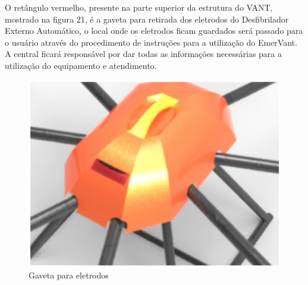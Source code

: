 O retângulo vermelho, presente na parte superior da estrutura do VANT, mostrado na figura 21, é a gaveta para retirada dos eletrodos do Desfibrilador Externo Automático, o local onde os eletrodos ficam guardados será passado para o usuário através do procedimento de instruções para a utilização do EmerVant. A central ficará responsável por dar todas as informações necessárias para a utilização do equipamento e atendimento.

\begin{figure}[H]
    \centering
      \includegraphics[keepaspectratio=true,scale=0.5]{figuras/keyshot2.eps}
    \caption{ Gaveta para eletrodos}
    \label{fig:keyshot2}
\end{figure}





















